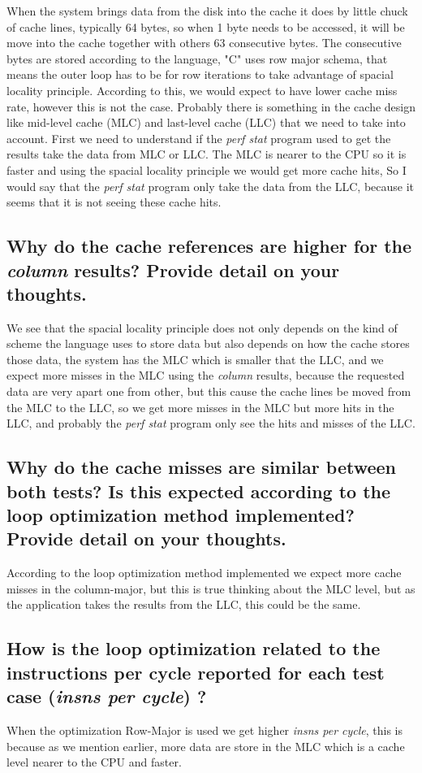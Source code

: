 \documentclass[12pt]{article}%
\begin{document}
When the system brings data from the disk into the cache it does by little chuck of cache lines, typically 64 bytes, so when 1 byte needs to be accessed, it will be move into the cache together with others 63 consecutive bytes. The consecutive bytes are stored according to the language, "C" uses row major schema, that means the outer loop has to be for row iterations to take advantage of spacial locality principle. 
According to this, we would expect to have lower cache miss rate, however this is not the case. Probably there is something in the cache design like mid-level cache (MLC) and last-level cache (LLC) that we need to take into account. First we need to understand if the \textit{perf stat} program used to get the results take the data from  MLC or LLC. The MLC is nearer to the CPU so it is faster and using the spacial locality principle we would get more cache hits,  So I would say that the \textit{perf stat} program only take the data from the LLC, because it seems that it is not seeing these cache hits. 

\subsection {Why do the cache references are higher for the \textit{column} results? Provide detail on your thoughts.}

We see that the spacial locality principle does not only depends on  the kind of scheme the language uses to store data but also depends on how the cache stores those data, the system has the MLC which is smaller that the LLC, and we expect more misses in the MLC using the \textit{column} results, because the requested data are very apart one from other, but this cause the cache lines be moved from the MLC to the LLC, so we get more misses in the MLC but more hits in the LLC, and probably the \textit{perf stat} program only see the hits and misses of the LLC. 

\subsection {Why do the cache misses are similar between both tests? Is this expected according to the loop optimization method implemented? Provide detail on your thoughts.}

According to the loop optimization method implemented we expect more cache misses in the column-major, but this is true thinking about the MLC level, but as the application takes the results from the LLC, this could be the same.  

\subsection {How is the loop optimization related to the instructions per cycle reported for each test case (\textit{insns per cycle}) ?}

When the optimization Row-Major is used we get higher \textit{insns per cycle}, this is because as we mention earlier, more data are store in the MLC which is a cache level nearer to the CPU and faster.   
\end{document}
